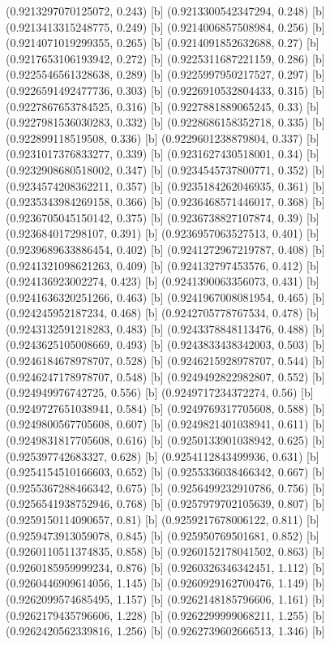 {{{(0.9213297070125072, 0.243) [b] 
(0.9213300542347294, 0.248) [b] 
(0.9213413315248775, 0.249) [b] 
(0.9214006857508984, 0.256) [b] 
(0.9214071019299355, 0.265) [b] 
(0.9214091852632688, 0.27) [b] 
(0.9217653106193942, 0.272) [b] 
(0.9225311687221159, 0.286) [b] 
(0.9225546561328638, 0.289) [b] 
(0.9225997950217527, 0.297) [b] 
(0.9226591492477736, 0.303) [b] 
(0.9226910532804433, 0.315) [b] 
(0.9227867653784525, 0.316) [b] 
(0.9227881889065245, 0.33) [b] 
(0.9227981536030283, 0.332) [b] 
(0.9228686158352718, 0.335) [b] 
(0.922899118519508, 0.336) [b] 
(0.9229601238879804, 0.337) [b] 
(0.9231017376833277, 0.339) [b] 
(0.9231627430518001, 0.34) [b] 
(0.9232908680518002, 0.347) [b] 
(0.9234545737800771, 0.352) [b] 
(0.9234574208362211, 0.357) [b] 
(0.9235184262046935, 0.361) [b] 
(0.9235343984269158, 0.366) [b] 
(0.9236468571446017, 0.368) [b] 
(0.9236705045150142, 0.375) [b] 
(0.9236738827107874, 0.39) [b] 
(0.923684017298107, 0.391) [b] 
(0.9236957063527513, 0.401) [b] 
(0.9239689633886454, 0.402) [b] 
(0.9241272967219787, 0.408) [b] 
(0.9241321098621263, 0.409) [b] 
(0.924132797453576, 0.412) [b] 
(0.924136923002274, 0.423) [b] 
(0.9241390063356073, 0.431) [b] 
(0.9241636320251266, 0.463) [b] 
(0.9241967008081954, 0.465) [b] 
(0.924245952187234, 0.468) [b] 
(0.9242705778767534, 0.478) [b] 
(0.9243132591218283, 0.483) [b] 
(0.9243378848113476, 0.488) [b] 
(0.9243625105008669, 0.493) [b] 
(0.9243833438342003, 0.503) [b] 
(0.9246184678978707, 0.528) [b] 
(0.9246215928978707, 0.544) [b] 
(0.9246247178978707, 0.548) [b] 
(0.9249492822982807, 0.552) [b] 
(0.924949976742725, 0.556) [b] 
(0.9249717234372274, 0.56) [b] 
(0.9249727651038941, 0.584) [b] 
(0.9249769317705608, 0.588) [b] 
(0.9249800567705608, 0.607) [b] 
(0.9249821401038941, 0.611) [b] 
(0.9249831817705608, 0.616) [b] 
(0.9250133901038942, 0.625) [b] 
(0.925397742683327, 0.628) [b] 
(0.9254112843499936, 0.631) [b] 
(0.9254154510166603, 0.652) [b] 
(0.9255336038466342, 0.667) [b] 
(0.9255367288466342, 0.675) [b] 
(0.9256499232910786, 0.756) [b] 
(0.9256541938752946, 0.768) [b] 
(0.9257979702105639, 0.807) [b] 
(0.9259150114090657, 0.81) [b] 
(0.9259217678006122, 0.811) [b] 
(0.9259473913059078, 0.845) [b] 
(0.925950769501681, 0.852) [b] 
(0.9260110511374835, 0.858) [b] 
(0.9260152178041502, 0.863) [b] 
(0.9260185959999234, 0.876) [b] 
(0.9260326346342451, 1.112) [b] 
(0.9260446909614056, 1.145) [b] 
(0.9260929162700476, 1.149) [b] 
(0.9262099574685495, 1.157) [b] 
(0.9262148185796606, 1.161) [b] 
(0.9262179435796606, 1.228) [b] 
(0.9262299999068211, 1.255) [b] 
(0.9262420562339816, 1.256) [b] 
(0.9262739602666513, 1.346) [b] 
}}}
